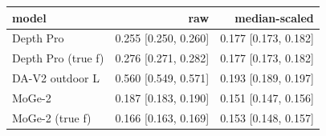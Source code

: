 \footnotesize\renewcommand{\arraystretch}{0.92}
\begin{tabular}{lrr}
\toprule
model & raw & median-scaled \\
\midrule
Depth Pro & 0.255 [0.250, 0.260] & 0.177 [0.173, 0.182] \\
Depth Pro (true f) & 0.276 [0.271, 0.282] & 0.177 [0.173, 0.182] \\
DA-V2 outdoor L & 0.560 [0.549, 0.571] & 0.193 [0.189, 0.197] \\
MoGe-2 & 0.187 [0.183, 0.190] & 0.151 [0.147, 0.156] \\
MoGe-2 (true f) & 0.166 [0.163, 0.169] & 0.153 [0.148, 0.157] \\
\bottomrule
\end{tabular}
